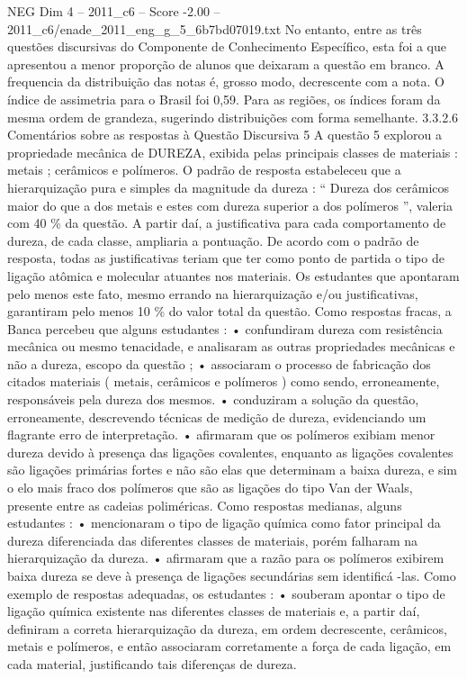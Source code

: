 \begin{textsample}{NEG Dim 4 – 2011\_c6 – Score -2.00 – 2011\_c6/enade\_2011\_eng\_g\_5\_6b7bd07019.txt}
No entanto, entre as três questões discursivas do Componente de Conhecimento Específico, esta foi a que apresentou a menor proporção de alunos que deixaram a questão em branco.
A frequencia da distribuição das notas é, grosso modo, decrescente com a nota.
O índice de assimetria para o Brasil foi 0,59.
Para as regiões, os índices foram da mesma ordem de grandeza, sugerindo distribuições com forma semelhante. 3.3.2.6 Comentários sobre as respostas à Questão Discursiva 5 A questão 5 explorou a propriedade mecânica de DUREZA, exibida pelas principais classes de materiais : metais ; cerâmicos e polímeros.
O padrão de resposta estabeleceu que a hierarquização pura e simples da magnitude da dureza : “ Dureza dos cerâmicos maior do que a dos metais e estes com dureza superior a dos polímeros ”, valeria com 40 \% da questão.
A partir daí, a justificativa para cada comportamento de dureza, de cada classe, ampliaria a pontuação.
De acordo com o padrão de resposta, todas as justificativas teriam que ter como ponto de partida o tipo de ligação atômica e molecular atuantes nos materiais.
Os estudantes que apontaram pelo menos este fato, mesmo errando na hierarquização e/ou justificativas, garantiram pelo menos 10 \% do valor total da questão.
Como respostas fracas, a Banca percebeu que alguns estudantes : • confundiram dureza com resistência mecânica ou mesmo tenacidade, e analisaram as outras propriedades mecânicas e não a dureza, escopo da questão ; • associaram o processo de fabricação dos citados materiais ( metais, cerâmicos e polímeros ) como sendo, erroneamente, responsáveis pela dureza dos mesmos. • conduziram a solução da questão, erroneamente, descrevendo técnicas de medição de dureza, evidenciando um flagrante erro de interpretação. • afirmaram que os polímeros exibiam menor dureza devido à presença das ligações covalentes, enquanto as ligações covalentes são ligações primárias fortes e não são elas que determinam a baixa dureza, e sim o elo mais fraco dos polímeros que são as ligações do tipo Van der Waals, presente entre as cadeias poliméricas.
Como respostas medianas, alguns estudantes : • mencionaram o tipo de ligação química como fator principal da dureza diferenciada das diferentes classes de materiais, porém falharam na hierarquização da dureza. • afirmaram que a razão para os polímeros exibirem baixa dureza se deve à presença de ligações secundárias sem identificá -las.
Como exemplo de respostas adequadas, os estudantes : • souberam apontar o tipo de ligação química existente nas diferentes classes de materiais e, a partir daí, definiram a correta hierarquização da dureza, em ordem decrescente, cerâmicos, metais e polímeros, e então associaram corretamente a força de cada ligação, em cada material, justificando tais diferenças de dureza.

\end{textsample}

